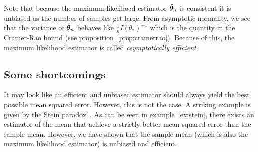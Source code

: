 Note that because the maximum likelihood estimator $\hat{\boldsymbol{\theta}}_n$ is consistent it is unbiased
as the number of samples get large. From asymptotic normality, we see that the
variance of $\hat{\boldsymbol{\theta}}_n$ behaves like $\frac1{n}I(\theta_*)^{-1}$ which is
the quantity in the Cramer-Rao bound (see proposition~\ref{prop:cramerrao}).
Because of this, the maximum likelihood estimator is called \emph{asymptotically
  efficient}.

\subsection{Some shortcomings}
It may look like an efficient and unbiased estimator should always yield the
best possible mean squared error.
However, this is not the case. A striking example is given by the Stein paradox~\cite{stein1956inadmissibility}.
As can be seen in example~\ref{ex:stein}, there exists an estimator of the mean
that achieve a strictly better mean squared error than the sample mean.
However, we have shown that the sample mean (which is also the maximum
likelihood estimator) is unbiased and efficient. 

